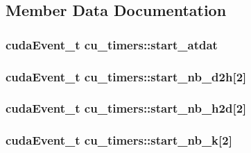 \subsection{\-Member \-Data \-Documentation}
\hypertarget{structcu__timers_af6d87c7ba4498ffb72f82fc3171d192f}{
\subsubsection[{start\-\_\-atdat}]{\setlength{\rightskip}{0pt plus 5cm}cuda\-Event\-\_\-t {\bf cu\-\_\-timers\-::start\-\_\-atdat}}}\label{structcu__timers_af6d87c7ba4498ffb72f82fc3171d192f}
\hypertarget{structcu__timers_a16f3ae5e6f9905eb01b4b100c063217f}{
\subsubsection[{start\-\_\-nb\-\_\-d2h}]{\setlength{\rightskip}{0pt plus 5cm}cuda\-Event\-\_\-t {\bf cu\-\_\-timers\-::start\-\_\-nb\-\_\-d2h}\mbox{[}2\mbox{]}}}\label{structcu__timers_a16f3ae5e6f9905eb01b4b100c063217f}
\hypertarget{structcu__timers_ab6af0f88daf5b1a187fa36c5a76db2f7}{
\subsubsection[{start\-\_\-nb\-\_\-h2d}]{\setlength{\rightskip}{0pt plus 5cm}cuda\-Event\-\_\-t {\bf cu\-\_\-timers\-::start\-\_\-nb\-\_\-h2d}\mbox{[}2\mbox{]}}}\label{structcu__timers_ab6af0f88daf5b1a187fa36c5a76db2f7}
\hypertarget{structcu__timers_a12472be878f452a7433068b53e326546}{
\subsubsection[{start\-\_\-nb\-\_\-k}]{\setlength{\rightskip}{0pt plus 5cm}cuda\-Event\-\_\-t {\bf cu\-\_\-timers\-::start\-\_\-nb\-\_\-k}\mbox{[}2\mbox{]}}}\label{structcu__timers_a12472be878f452a7433068b53e326546}
